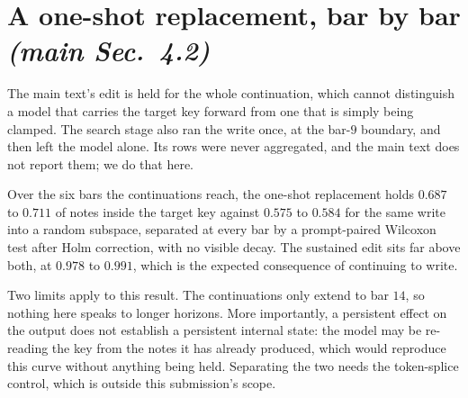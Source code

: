 \documentclass{article}
\begin{document}
\section{A one-shot replacement, bar by bar \normalfont\textit{(main Sec.~4.2)}}
\label{sec:oneshot}
%

The main text's edit is held for the whole continuation, which cannot distinguish a model
that carries the target key forward from one that is simply being clamped. The search
stage also ran the write once, at the bar-$9$ boundary, and then left the model alone. Its
rows were never aggregated, and the main text does not report them; we do that here.

Over the six bars the continuations reach, the one-shot replacement holds $0.687$ to $0.711$
of notes inside the target key against $0.575$ to $0.584$ for the same write into a
random subspace, separated at every bar by a prompt-paired Wilcoxon test after Holm
correction, with no visible decay. The sustained edit sits far above both, at $0.978$ to
$0.991$, which is the expected consequence of continuing to write.

Two limits apply to this result. The continuations only extend to bar $14$, so nothing
here speaks to longer horizons. More importantly, a persistent effect on the output does
not establish a persistent internal state: the model may be re-reading the key from the
notes it has already produced, which would reproduce this curve without anything being
held. Separating the two needs the token-splice control, which is outside this
submission's scope.
\end{document}
